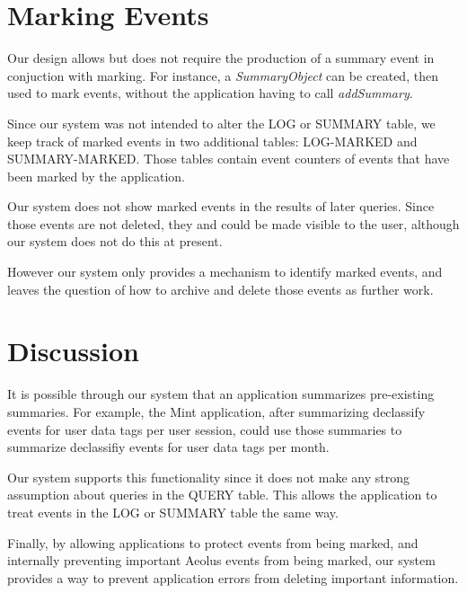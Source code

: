 \section{Marking Events}

Our design allows but does not require the production of a summary event in conjuction with marking. For instance, a \emph{SummaryObject} can be created, then used to mark events, without the application having to call \emph{addSummary}.

Since our system was not intended to alter the LOG or SUMMARY table, we keep track of marked events in two additional tables: LOG-MARKED and SUMMARY-MARKED. Those tables contain event counters of events that have been marked by the application.

Our system does not show marked events in the results of later queries. Since those events are not deleted, they and could be made visible to the user, although our system does not do this at present.

However our system only provides a mechanism to identify marked events, and leaves the question of how to archive and delete those events as further work.




\section{Discussion}

It is possible through our system that an application summarizes pre-existing summaries. For example, the Mint application, after summarizing declassify events for user data tags per user session, could use those summaries to summarize declassifiy events for user data tags per month.

Our system supports this functionality since it does not make any strong assumption about queries in the QUERY table. This allows the application to treat events in the LOG or SUMMARY table the same way.

Finally, by allowing applications to protect events from being marked, and internally preventing important Aeolus events from being marked, our system provides a way to prevent application errors from deleting important information.
